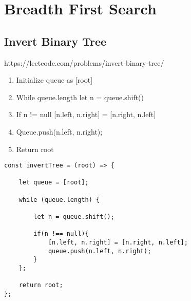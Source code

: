 \documentclass[10pt]{article}
\begin{document}
\medskip %














\pagebreak
\section{Breadth First Search}








\medskip   
\subsection {Invert Binary Tree}
https://leetcode.com/problems/invert-binary-tree/

\begin{enumerate}
	\item Initialize queue as [root]
	\item While queue.length let n = queue.shift()
	\item If n != null [n.left, n.right] = [n.right, n.left]
	\item Queue.push(n.left, n.right);
	\item Return root
\end{enumerate}

\begin{lstlisting}[title=Solution mergeTrees, captionpos=t]
const invertTree = (root) => {
    
    let queue = [root];
    
    while (queue.length) {
        
        let n = queue.shift();
        
        if(n !== null){
            [n.left, n.right] = [n.right, n.left];
            queue.push(n.left, n.right);
        }
    };
    
    return root;
};
\end{lstlisting}

\medskip %
\end{document}
